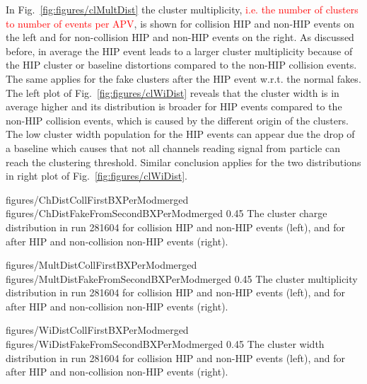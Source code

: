 In Fig.~\ref{fig:figures/clMultDist} the cluster multiplicity, \textcolor{red}{ i.e. the number of clusters to number of events per APV}, is shown for collision HIP and non-HIP events on the left and for  non-collision HIP and non-HIP events on the right. As discussed before, in average the HIP event leads to a larger cluster multiplicity because of the HIP cluster or baseline distortions compared to the non-HIP collision events. The same applies for the fake clusters after the HIP event w.r.t. the normal fakes. The left plot of Fig.~\ref{fig:figures/clWiDist} reveals that the cluster width is in average higher and its distribution is broader for HIP events compared to the non-HIP collision events, which is caused by the different origin of the clusters. The low cluster width population for the HIP events can appear due the drop of a baseline which causes that not all channels reading signal from particle can reach the clustering threshold. Similar conclusion applies for the two distributions in right plot of Fig.~\ref{fig:figures/clWiDist}.  

                 {figures/ChDistCollFirstBXPerModmerged} %
                 {figures/ChDistFakeFromSecondBXPerModmerged} %
                 {0.45}       %
                 { The cluster charge distribution in run 281604 for collision HIP and non-HIP events (left), and for after HIP and non-collision non-HIP events (right).   } %

                 {figures/MultDistCollFirstBXPerModmerged} %
                 {figures/MultDistFakeFromSecondBXPerModmerged} %
                 {0.45}       %
                 { The cluster multiplicity distribution in run 281604 for collision HIP and non-HIP events (left), and for after HIP and non-collision non-HIP events (right). } %

                 {figures/WiDistCollFirstBXPerModmerged} %
                 {figures/WiDistFakeFromSecondBXPerModmerged} %
                 {0.45}       %
                 {  The cluster width distribution in run 281604 for collision HIP and non-HIP events (left), and for after HIP and non-collision non-HIP events (right).} %


